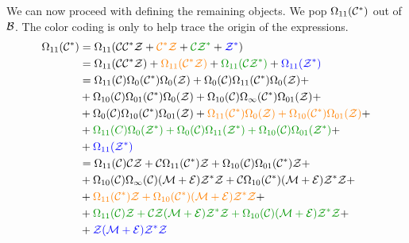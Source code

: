 \documentclass[12pt, a4paper, twoside]{report}
\begin{document}
We can now proceed with defining the remaining objects. We pop $\Omega_{11}(\mathcal{C}^*)$ out of $\mathcal{B}$. The color coding is only to help trace the origin of the expressions.
\begin{align}
  \begin{aligned}
  \Omega_{11}(\Cstar) &= \Omega_{11}(\C\Cstar\Z+ \textcolor{orange}{\Cstar\Z} + \textcolor{green}{\C\Z^*} + \textcolor{blue}{\Z^*})\\
                      &= \Omega_{11}(\C\Cstar\Z) + \textcolor{orange}{\Omega_{11}(\Cstar\Z)} + \textcolor{green}{\Omega_{11}(\C\Z^*)} + \textcolor{blue}{\Omega_{11}(\Z^*)}\\
                      &= \Omega_{11}(\C)\Omega_0(\Cstar)\Omega_0(\Z) + \Omega_0(\C)\Omega_{11}(\Cstar)\Omega_0(\Z) +\\
                      &+ \Omega_{10}(\C)\Omega_{01}(\Cstar)\Omega_0(\Z) + \Omega_{10}(\C)\Omega_\infty(\Cstar)\Omega_{01}(\Z) +\\
                      &+ \Omega_0(\C)\Omega_{10}(\Cstar)\Omega_{01}(\Z) + \textcolor{orange}{\Omega_{11}(\Cstar)\Omega_0(\Z) + \Omega_{10}(\Cstar)\Omega_{01}(\Z)} +\\
                      &+ \textcolor{green}{\Omega_{11}(C)\Omega_0(\Z^*) + \Omega_0(\C)\Omega_{11}(\Z^*) + \Omega_{10}(\C)\Omega_{01}(\Z^*)} +\\
                      &+ \textcolor{blue}{\Omega_{11}(\Z^*)}\\
                      &= \Omega_{11}(\C)\C\Z + \C\Omega_{11}(\Cstar)\Z + \Omega_{10}(\C)\Omega_{01}(\Cstar)\Z +\\
                      &+ \Omega_{10}(\C)\Omega_\infty(\C)(\M+\EE)\Z^*\Z +\C\Omega_{10}(\Cstar)(\M+\EE)\Z^*\Z + \\
                      &+ \textcolor{orange}{\Omega_{11}(\Cstar)\Z + \Omega_{10}(\Cstar)(\M+\EE)\Z^*\Z} +\\
                      &+ \textcolor{green}{\Omega_{11}(\C)\Z + \C\Z(\M+\EE)\Z^*\Z + \Omega_{10}(\C)(\M+\EE)\Z^*\Z} +\\
                      &+\textcolor{blue}{\Z(\M+\EE)\Z^*\Z}\\
                    \end{aligned}
                        \label{eq:exampleAv321Av21_omega11Cstar}
\end{align}
\end{document}
